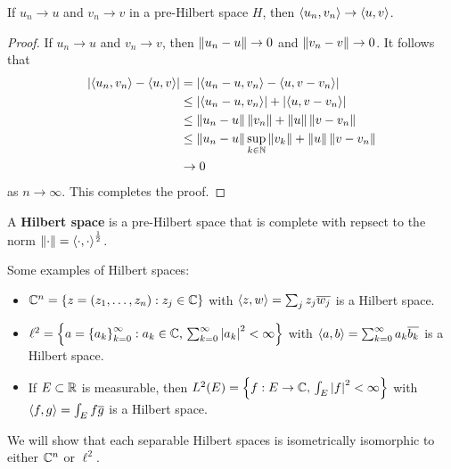 \documentclass[a4paper]{article}
\begin{document}
\begin{thm}
If $u_n \to u$ and $v_n \to v$ in a pre-Hilbert space $H$, 
then $\left\langle u_n, v_n \right\rangle \to \left\langle u, v \right\rangle$.
\end{thm}

\begin{proof}
  If $u_n \to u$ and $v_n \to v$, then 
  $\left\lVert u_n - u\right\rVert \to 0$ and $\left\lVert v_n - v\right\rVert \to 0$. 
  It follows that 
  \[
  \begin{aligned}
    \left\lvert \left\langle u_n, v_n \right\rangle - \left\langle u, v \right\rangle\right\rvert 
    &= \left\lvert \left\langle u_n - u, v_n \right\rangle - \left\langle u, v - v_n \right\rangle\right\rvert \\
    &\leq \left\lvert \left\langle u_n - u, v_n \right\rangle\right\rvert 
    + \left\lvert \left\langle u, v - v_n \right\rangle\right\rvert \\
    &\leq \left\lVert u_n - u\right\rVert \left\lVert v_n\right\rVert + \left\lVert u\right\rVert \left\lVert v - v_n\right\rVert \\
    &\leq \left\lVert u_n - u\right\rVert \sup_{k \in \mathbb{N}} \left\lVert v_k\right\rVert + \left\lVert u\right\rVert 
    \left\lVert v - v_n\right\rVert \\
    &\to 0 
  \end{aligned}
  \]
  as $n \to \infty$. This completes the proof.
\end{proof}

\begin{defi}
A \textbf{Hilbert space} is a pre-Hilbert space that is 
complete with repsect to the norm 
$\left\lVert \cdot\right\rVert = \left\langle \cdot, \cdot \right\rangle^{\frac{1}{2}}$.
\end{defi}

\begin{eg}
Some examples of Hilbert spaces: 
\begin{itemize}
  \item $\mathbb{C}^n = \left\{ z = (z_1, \dots, z_n) : z_j \in \mathbb{C} \right\}$
  with
  $\left\langle z, w \right\rangle = \sum_j z_j \overline{w_j}$ is a Hilbert 
  space.

  \item $\ell^2 = \left\{ a = \left\{ a_k \right\}_{k=0}^\infty : 
  \text{$a_k \in \mathbb{C}$, $\sum_{k=0}^\infty \left\lvert a_k\right\rvert^2 < \infty$} \right\}$ 
  with
  $\left\langle a, b \right\rangle = \sum_{k=0}^\infty a_k \overline{b_k}$ 
  is a Hilbert space.

  \item If $E \subset \mathbb{R}$ is measurable, then 
  $L^2(E) = \left\{ f: \text{$E \to \mathbb{C}$, 
  $\int_E \left\lvert f\right\rvert^2 < \infty$} \right\}$ with 
  $\left\langle f, g \right\rangle = \int_E f \overline{g}$ is a Hilbert 
  space.
\end{itemize}
We will show that each separable Hilbert spaces is 
isometrically isomorphic to either $\mathbb{C}^n$ or $\ell^2$.
\end{eg}
\end{document}
